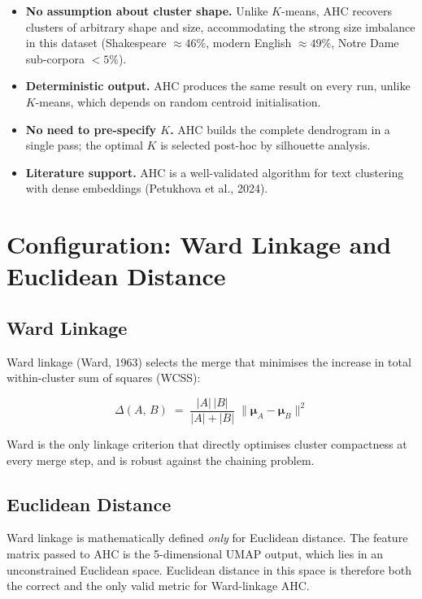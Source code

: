 \documentclass[11pt, a4paper]{article}
\begin{document}
\begin{itemize}
  \item \textbf{No assumption about cluster shape.}  Unlike $K$-means, AHC
        recovers clusters of arbitrary shape and size, accommodating the
        strong size imbalance in this dataset (Shakespeare $\approx 46\%$,
        modern English $\approx 49\%$, Notre Dame sub-corpora $<5\%$).

  \item \textbf{Deterministic output.}  AHC produces the same result on
        every run, unlike $K$-means, which depends on random centroid
        initialisation.

  \item \textbf{No need to pre-specify $K$.}  AHC builds the complete
        dendrogram in a single pass; the optimal $K$ is selected post-hoc by
        silhouette analysis.

  \item \textbf{Literature support.}  AHC is a well-validated algorithm for
        text clustering with dense embeddings (Petukhova et al., 2024).
\end{itemize}

\section{Configuration: Ward Linkage and Euclidean Distance}

\subsection{Ward Linkage}

Ward linkage (Ward, 1963) selects the merge that minimises the increase in
total within-cluster sum of squares (WCSS):

\begin{mathbox}
\[
  \Delta(A,\,B)
  \;=\;
  \frac{|A|\,|B|}{|A|+|B|}
  \;\|\boldsymbol{\mu}_A - \boldsymbol{\mu}_B\|^{2}
\]
\end{mathbox}

Ward is the only linkage criterion that directly optimises cluster compactness
at every merge step, and is robust against the chaining problem.

\subsection{Euclidean Distance}

Ward linkage is mathematically defined \emph{only} for Euclidean distance.
The feature matrix passed to AHC is the 5-dimensional UMAP output, which lies
in an unconstrained Euclidean space.  Euclidean distance in this space is
therefore both the correct and the only valid metric for Ward-linkage AHC.
\end{document}
